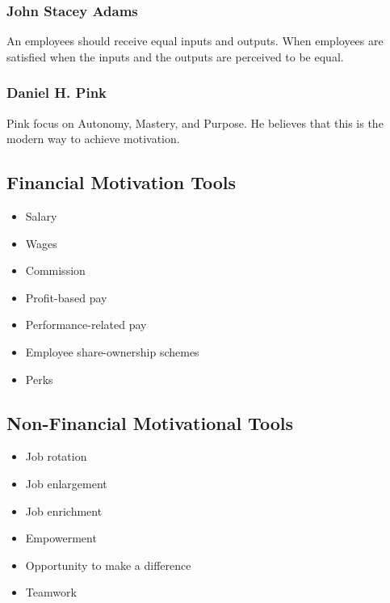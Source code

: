\documentclass{standalone}
\begin{document}
\subsubsection{John Stacey Adams}
An employees should receive equal inputs and outputs.
When employees are satisfied when the inputs and the outputs are perceived to be equal.

\subsubsection{Daniel H. Pink}
Pink focus on Autonomy, Mastery, and Purpose.
He believes that this is the modern way to achieve motivation.

\subsection{Financial Motivation Tools}
\begin{itemize}
	\item Salary
	\item Wages
	\item Commission
	\item Profit-based pay
	\item Performance-related pay
	\item Employee share-ownership schemes
	\item Perks
\end{itemize}

\subsection{Non-Financial Motivational Tools}
\begin{itemize}
	\item Job rotation
	\item Job enlargement
	\item Job enrichment
	\item Empowerment
	\item Opportunity to make a difference
	\item Teamwork
\end{itemize}

	
\end{document}

